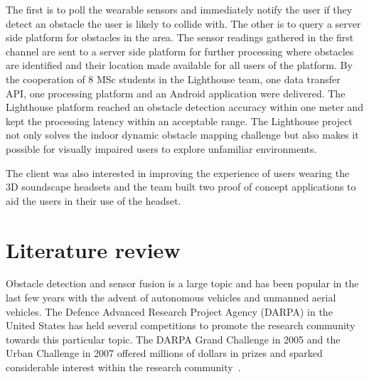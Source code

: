 \documentclass[prodmode,acmtosem]{acmsmall} %
\begin{document}
The first is to poll the wearable sensors and immediately notify the user if they detect an obstacle the user is likely to collide with. The other is to query a server side platform for obstacles in the area. The sensor readings gathered in the first channel are sent to a server side platform for further processing where obstacles are identified and their location made available for all users of the platform. 
By the cooperation of 8 MSc students in the Lighthouse team, one data transfer API, one processing platform and an Android application were delivered. 
The Lighthouse platform reached an obstacle detection accuracy within one meter and kept the processing latency within an acceptable range. The Lighthouse project not only solves the indoor dynamic obstacle mapping challenge but also makes it possible for visually impaired users to explore unfamiliar environments.

The client was also interested in improving the experience of users wearing the 3D soundscape headsets and the team built two proof of concept applications to aid the users in their use of the headset.


\section{Literature review} %
Obstacle detection and sensor fusion is a  large topic and has been popular in the last few years with the advent of autonomous vehicles and unmanned aerial vehicles.
The Defence Advanced Research Project Agency (DARPA) in the United States has held several competitions to promote the research community towards this particular topic. The DARPA Grand Challenge in 2005 and the Urban Challenge in 2007 offered millions of dollars in prizes and sparked considerable interest within the research community~\cite{DARPAGrandChallenge2005,DARPAUrbanChallenge2007}.
\end{document}
